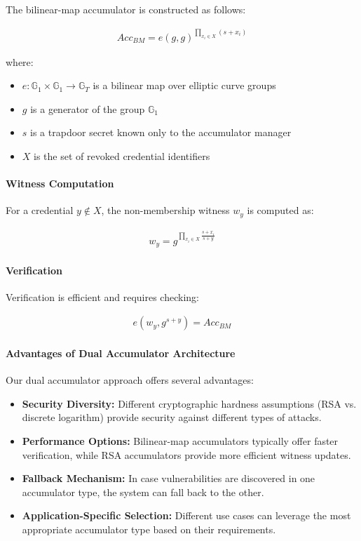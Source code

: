 \documentclass[lettersize,journal]{IEEEtran}
\begin{document}
\begin{itemize}
The bilinear-map accumulator is constructed as follows:

\begin{align}
Acc_{BM} = e(g, g)^{\prod_{x_i \in X} (s + x_i)}
\end{align}

where:
\begin{itemize}
    \item $e: \mathbb{G}_1 \times \mathbb{G}_1 \rightarrow \mathbb{G}_T$ is a bilinear map over elliptic curve groups
    \item $g$ is a generator of the group $\mathbb{G}_1$
    \item $s$ is a trapdoor secret known only to the accumulator manager
    \item $X$ is the set of revoked credential identifiers
\end{itemize}

\paragraph{Witness Computation} For a credential $y \notin X$, the non-membership witness $w_y$ is computed as:

\begin{align}
w_y = g^{\prod_{x_i \in X} \frac{s + x_i}{s + y}}
\end{align}

\paragraph{Verification} Verification is efficient and requires checking:

\begin{align}
e(w_y, g^{s+y}) = Acc_{BM}
\end{align}

\paragraph{Advantages of Dual Accumulator Architecture}
Our dual accumulator approach offers several advantages:
\begin{itemize}
    \item \textbf{Security Diversity:} Different cryptographic hardness assumptions (RSA vs. discrete logarithm) provide security against different types of attacks.
    \item \textbf{Performance Options:} Bilinear-map accumulators typically offer faster verification, while RSA accumulators provide more efficient witness updates.
    \item \textbf{Fallback Mechanism:} In case vulnerabilities are discovered in one accumulator type, the system can fall back to the other.
    \item \textbf{Application-Specific Selection:} Different use cases can leverage the most appropriate accumulator type based on their requirements.
\end{itemize}


\end{itemize}
\end{document}
